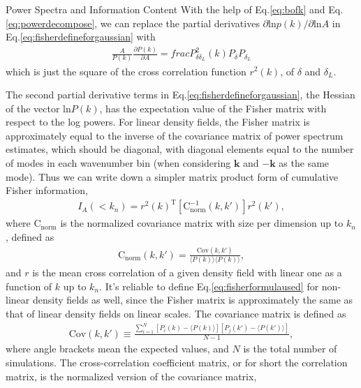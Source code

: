 \begin{section}{Power Spectra and Information Content}
   With the help of Eq.\ref{eq:bofk} and Eq.\ref{eq:powerdecompose}, we can replace the partial derivatives 
$\partial \mathrm{ln} p(k) / \partial \mathrm{ln} A$ in Eq.\ref{eq:fisherdefineforgaussian} with 
\begin{align}
   \frac{A}{P(k)}\frac{\partial P(k)}{\partial A}=frac{P_{\delta \delta_L}^2(k)}{P_\delta P_{\delta_L}}
\end{align}
which is just the square of the 
cross correlation function $r ^2 (k)$, of $\delta$ and $\delta_L$. 

The second partial derivative terms in 
Eq.\ref{eq:fisherdefineforgaussian}, the Hessian of the vector $\mathrm{ln} P(k)$, has the expectation 
value of the Fisher matrix with respect to the log powers. For linear density fields, the Fisher matrix is 
approximately equal to the inverse of the covariance matrix of power spectrum estimates, which should be diagonal, 
with diagonal elements equal to the number of modes in each wavenumber bin (when considering $\bm{k}$ and $-\bm{k}$ 
as the same mode). Thus we can write down a simpler matrix product form of cumulative Fisher information, 
\begin{align}
    I_A \left( < k_n\right) = r^2(k)^{\mathrm{T}} \left[ \mathrm{C^{-1}_{norm}} ( k,k' )\right] r^2(k') ,
\label{eq:fisherformulaused}
\end{align}
where $\mathrm{C_{norm}}$ is the normalized covariance matrix with size per dimension up to $k_n$, defined as
\begin{align}
    \mathrm{C_{norm}} \left( k,k' \right)=\frac{\mathrm{Cov}(k,k')}{\langle P(k)\rangle\langle P(k)\rangle},
\end{align}
and $r$ is the mean cross correlation of a given density field with linear one as a function of $k$ up to $k_n$. 
It's reliable to define Eq.\ref{eq:fisherformulaused} for non-linear density fields as well, 
since the Fisher matrix is approximately the same as that of linear density fields on linear scales. 
The covariance matrix is defined as 
\begin{align}
    \mathrm{Cov}\left(k,k'\right)\equiv \frac{\sum_{i=1}^{N}\left[ P_i \left( k \right) - 
\langle P \left( k \right) \rangle \right]\left[ P_j \left( k' \right) - \langle P \left( k' \right)\rangle \right]}{N-1},
\end{align}
where angle brackets mean the expected values, and $N$ is the total number of simulations.
    The  cross-correlation coefficient matrix, or for short the correlation matrix, is the normalized version of the covariance matrix,

\end{section}
